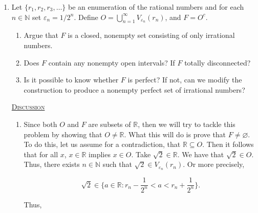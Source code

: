 \documentclass[12pt, a4paper]{article}
\begin{document}
\begin{enumerate}[leftmargin=*]
    \item Let $\{r_1, r_2, r_3, \dots\}$ be an enumeration of the rational numbers and for each $n\in\mathbb{N}$ set $\varepsilon_n=1/2^n$. Define $O=\bigcup_{n=1}^{\infty}V_{\varepsilon_n}(r_n)$, and $F=O^c$.
    
    \begin{enumerate}[label=(\alph*), rightmargin=10mm]
        \item Argue that $F$ is a closed, nonempty set consisting of only irrational numbers.
        \item Does $F$ contain any nonempty open intervals? If $F$ totally disconnected?
        \item Is it possible to know whether $F$ is perfect? If not, can we modify the construction to produce a nonempty perfect set of irrational numbers?
    \end{enumerate}
    
    \vspace{4mm}
    
    \underline{\textsc{Discussion}}
    
    \begin{enumerate}[label=(\alph*), listparindent=1.5em, labelsep=0.5em, itemindent=1.5em, rightmargin=10mm]
        \item \noindent Since both $O$ and $F$ are subsets of $\mathbb{R}$, then we will try to tackle this problem by showing that $O\neq\mathbb{R}$. What this will do is prove that $F\neq\varnothing$. To do this, let us assume for a contradiction, that $\mathbb{R}\subseteq O$. Then it follows that for all $x$, $x\in\mathbb{R}$ implies $x\in O$. Take $\sqrt{2}\in\mathbb{R}$. We have that $\sqrt{2}\in O$. Thus, there exists $n\in\mathbb{N}$ such that $\sqrt{2}\in V_{\varepsilon_n}(r_n)$. Or more precisely,
        
        \begin{equation*}
            \sqrt{2}\in\{a\in\mathbb{R}\colon r_n-\frac{1}{2^n}<a<r_n+\frac{1}{2^n}\}.
        \end{equation*}
        
        \noindent Thus, 
        
        \begin{equation*}
            
        \end{equation*}
    \end{enumerate}
    
\end{enumerate}
\end{document}
